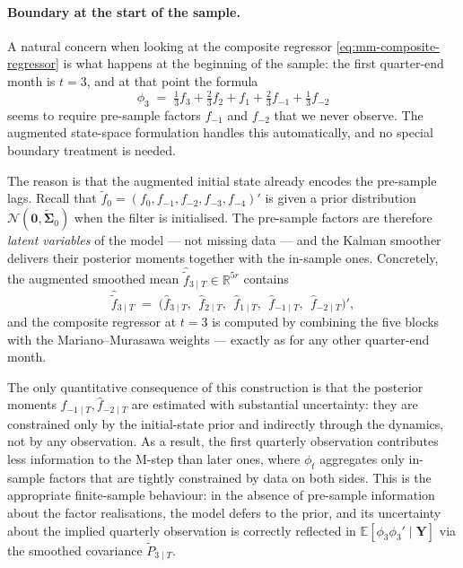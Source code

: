 \documentclass[11pt, a4paper, oneside]{article}
\newcommand{\mY}{\mathbf{Y}}
\begin{document}
\paragraph{Boundary at the start of the sample.}
A natural concern when looking at the composite regressor
\eqref{eq:mm-composite-regressor} is what happens at the beginning of
the sample: the first quarter-end month is $t = 3$, and at that point
the formula
\[
\phi_3 \;=\; \tfrac{1}{3} f_3 + \tfrac{2}{3} f_2 + f_1 + \tfrac{2}{3} f_{-1} + \tfrac{1}{3} f_{-2}
\]
seems to require pre-sample factors $f_{-1}$ and $f_{-2}$ that we
never observe. The augmented state-space formulation handles this
automatically, and no special boundary treatment is needed.

The reason is that the augmented initial state already encodes the
pre-sample lags. Recall that
$\tilde{f}_0 = (f_0, f_{-1}, f_{-2}, f_{-3}, f_{-4})'$ is given a
prior distribution $\mathcal{N}(\mathbf{0}, \tilde{\boldsymbol{\Sigma}}_0)$
when the filter is initialised. The pre-sample factors are therefore
\emph{latent variables} of the model — not missing data — and the
Kalman smoother delivers their posterior moments together with the
in-sample ones. Concretely, the augmented smoothed mean
$\hat{\tilde{f}}_{3 \mid T} \in \mathbb{R}^{5r}$ contains
\[
\hat{\tilde{f}}_{3 \mid T} \;=\; \big(\hat{f}_{3 \mid T},\;\, \hat{f}_{2 \mid T},\;\, \hat{f}_{1 \mid T},\;\, \hat{f}_{-1 \mid T},\;\, \hat{f}_{-2 \mid T}\big)',
\]
and the composite regressor at $t = 3$ is computed by combining the
five blocks with the Mariano--Murasawa weights — exactly as for any
other quarter-end month.

The only quantitative consequence of this construction is that the
posterior moments $\hat{f}_{-1 \mid T}, \hat{f}_{-2 \mid T}$ are
estimated with substantial uncertainty: they are constrained only by
the initial-state prior and indirectly through the dynamics, not by
any observation. As a result, the first quarterly observation
contributes less information to the M-step than later ones, where
$\phi_t$ aggregates only in-sample factors that are tightly
constrained by data on both sides. This is the appropriate
finite-sample behaviour: in the absence of pre-sample information
about the factor realisations, the model defers to the prior, and
its uncertainty about the implied quarterly observation is correctly
reflected in $\mathbb{E}[\phi_3 \phi_3' \mid \mY]$ via the smoothed
covariance $\tilde{P}_{3 \mid T}$.
\end{document}
